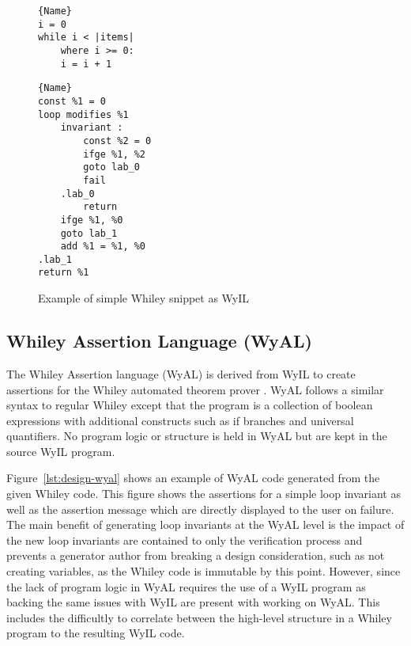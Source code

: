\begin{figure}
\noindent\begin{minipage}{.45\textwidth}
\begin{lstlisting}[caption={Whiley Code},frame=tlrb,numbers=none]{Name}
i = 0
while i < |items|
    where i >= 0:
    i = i + 1
\end{lstlisting}
\end{minipage}\hfill
\begin{minipage}{.45\textwidth}
\begin{lstlisting}[caption={WyIL Code},frame=tlrb,numbers=none]{Name}
const %1 = 0
loop modifies %1
    invariant :
        const %2 = 0
        ifge %1, %2
        goto lab_0
        fail
    .lab_0
        return
    ifge %1, %0
    goto lab_1
    add %1 = %1, %0
.lab_1
return %1
\end{lstlisting}
\end{minipage}
    \caption{Example of simple Whiley snippet as WyIL}
    \label{lst:design-wyil}
\end{figure}

\subsection{Whiley Assertion Language (WyAL)}

The Whiley Assertion language (WyAL) is derived from WyIL to create
assertions for the Whiley automated theorem prover \cite{wyal}.
WyAL follows a similar syntax to regular Whiley except that the program
is a collection of boolean expressions with additional constructs such as
if branches and universal quantifiers.
No program logic or structure is held in WyAL but are kept in the source
WyIL program.

Figure~\ref{lst:design-wyal} shows an example of WyAL code generated from
the given Whiley code.
This figure shows the assertions for a simple loop invariant as well as the
assertion message which are directly displayed to the user on failure.
The main benefit of generating loop invariants at the WyAL level is the
impact of the new loop invariants are contained to only the verification
process and prevents a generator author from breaking a design consideration,
such as not creating variables, as the Whiley code is immutable by this point.
However, since the lack of program logic in WyAL requires the use of a WyIL program
as backing the same issues with WyIL are present with working on WyAL.
This includes the difficultly to correlate between the high-level structure
in a Whiley program to the resulting WyIL code.

